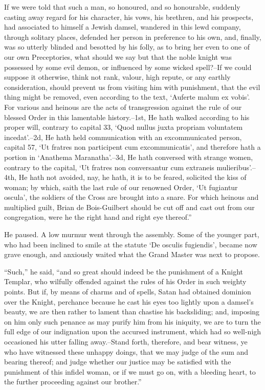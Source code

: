 If we were told that such a man, so honoured, and so honourable,
suddenly casting away regard for his character, his vows, his brethren,
and his prospects, had associated to himself a Jewish damsel, wandered
in this lewd company, through solitary places, defended her person in
preference to his own, and, finally, was so utterly blinded and besotted
by his folly, as to bring her even to one of our own Preceptories, what
should we say but that the noble knight was possessed by some evil
demon, or influenced by some wicked spell?--If we could suppose it
otherwise, think not rank, valour, high repute, or any earthly
consideration, should prevent us from visiting him with punishment, that
the evil thing might be removed, even according to the text, `Auferte
malum ex vobis'. For various and heinous are the acts of transgression
against the rule of our blessed Order in this lamentable history.--1st,
He hath walked according to his proper will, contrary to capital 33,
`Quod nullus juxta propriam voluntatem incedat'.--2d, He hath held
communication with an excommunicated person, capital 57, `Ut fratres non
participent cum excommunicatis', and therefore hath a portion in
`Anathema Maranatha'.--3d, He hath conversed with strange women,
contrary to the capital, `Ut fratres non conversantur cum extraneis
mulieribus'.--4th, He hath not avoided, nay, he hath, it is to be
feared, solicited the kiss of woman; by which, saith the last rule of
our renowned Order, `Ut fugiantur oscula', the soldiers of the Cross are
brought into a snare. For which heinous and multiplied guilt, Brian de
Bois-Guilbert should be cut off and cast out from our congregation, were
he the right hand and right eye thereof.''

He paused. A low murmur went through the assembly. Some of the younger
part, who had been inclined to smile at the statute `De osculis
fugiendis', became now grave enough, and anxiously waited what the Grand
Master was next to propose.

``Such,'' he said, ``and so great should indeed be the punishment of a
Knight Templar, who wilfully offended against the rules of his Order in
such weighty points. But if, by means of charms and of spells, Satan had
obtained dominion over the Knight, perchance because he cast his eyes
too lightly upon a damsel's beauty, we are then rather to lament than
chastise his backsliding; and, imposing on him only such penance as may
purify him from his iniquity, we are to turn the full edge of our
indignation upon the accursed instrument, which had so well-nigh
occasioned his utter falling away.--Stand forth, therefore, and bear
witness, ye who have witnessed these unhappy doings, that we may judge
of the sum and bearing thereof; and judge whether our justice may be
satisfied with the punishment of this infidel woman, or if we must go
on, with a bleeding heart, to the further proceeding against our
brother.''

